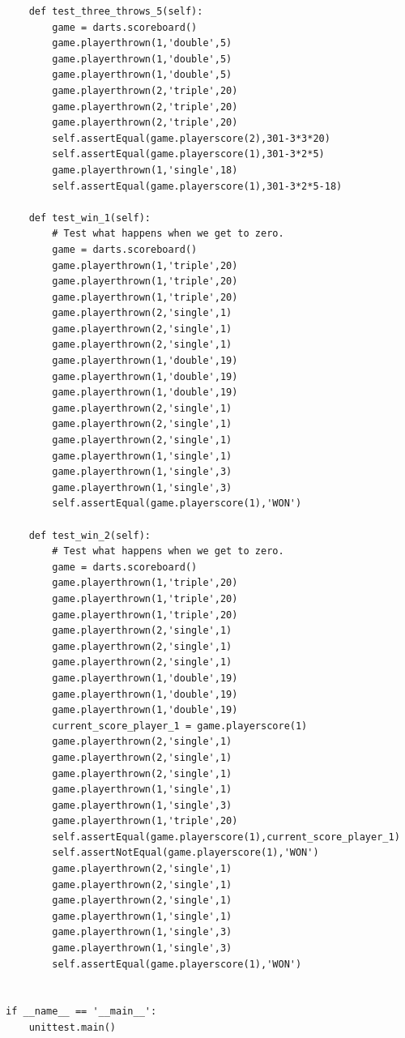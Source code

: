 \documentclass{paper}
\begin{document}
\begin{lstlisting}
    def test_three_throws_5(self):
        game = darts.scoreboard()
        game.playerthrown(1,'double',5)
        game.playerthrown(1,'double',5)
        game.playerthrown(1,'double',5)
        game.playerthrown(2,'triple',20)
        game.playerthrown(2,'triple',20)
        game.playerthrown(2,'triple',20)
        self.assertEqual(game.playerscore(2),301-3*3*20)
        self.assertEqual(game.playerscore(1),301-3*2*5)        
        game.playerthrown(1,'single',18)
        self.assertEqual(game.playerscore(1),301-3*2*5-18)

    def test_win_1(self):
        # Test what happens when we get to zero.
        game = darts.scoreboard()
        game.playerthrown(1,'triple',20)
        game.playerthrown(1,'triple',20)
        game.playerthrown(1,'triple',20)
        game.playerthrown(2,'single',1)
        game.playerthrown(2,'single',1)
        game.playerthrown(2,'single',1)
        game.playerthrown(1,'double',19)
        game.playerthrown(1,'double',19)
        game.playerthrown(1,'double',19)
        game.playerthrown(2,'single',1)
        game.playerthrown(2,'single',1)
        game.playerthrown(2,'single',1)
        game.playerthrown(1,'single',1)
        game.playerthrown(1,'single',3)
        game.playerthrown(1,'single',3)
        self.assertEqual(game.playerscore(1),'WON')
        
    def test_win_2(self):
        # Test what happens when we get to zero.
        game = darts.scoreboard()
        game.playerthrown(1,'triple',20)
        game.playerthrown(1,'triple',20)
        game.playerthrown(1,'triple',20)
        game.playerthrown(2,'single',1)
        game.playerthrown(2,'single',1)
        game.playerthrown(2,'single',1)
        game.playerthrown(1,'double',19)
        game.playerthrown(1,'double',19)
        game.playerthrown(1,'double',19)
        current_score_player_1 = game.playerscore(1)
        game.playerthrown(2,'single',1)
        game.playerthrown(2,'single',1)
        game.playerthrown(2,'single',1)
        game.playerthrown(1,'single',1)
        game.playerthrown(1,'single',3)
        game.playerthrown(1,'triple',20)
        self.assertEqual(game.playerscore(1),current_score_player_1)
        self.assertNotEqual(game.playerscore(1),'WON')
        game.playerthrown(2,'single',1)
        game.playerthrown(2,'single',1)
        game.playerthrown(2,'single',1)
        game.playerthrown(1,'single',1)
        game.playerthrown(1,'single',3)
        game.playerthrown(1,'single',3)
        self.assertEqual(game.playerscore(1),'WON')

        
if __name__ == '__main__':
    unittest.main()
\end{lstlisting}
\end{document}
